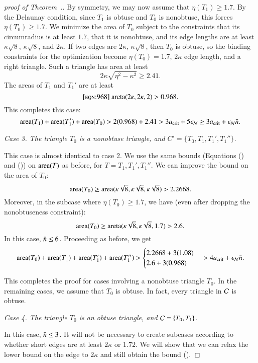 \begin{proof}[proof of Theorem~.]
By symmetry, we may now assume that $\eta(T_1) \ge 1.7$.  By the
Delaunay condition, since $T_1$ is obtuse and $T_0$ is nonobtuse, this
forces $\eta(T_0)\ge 1.7$.  We minimize the area of $T_0$ subject to
the constraints that its circumradius is at least $1.7$, that it is
nonobtuse, and its edge lengths are at least $\kappa\sqrt{8}$,
$\kappa\sqrt{8}$, and $2\kappa$.  If two edges are $2\kappa$,
$\kappa\sqrt{8}$, then $T_0$ is obtuse, so the binding constraints for
the optimization become $\eta(T_0)=1.7$, $2\kappa$ edge length, and a
right triangle.  Such a triangle has area at least
\[
2\kappa\sqrt{\eta^2 - \kappa^2} \ge 2.41.
\]  
The areas of $T_1$ and $T_1'$ are at least
\begin{equation}\libel{eqn:968}
\areta(2\kappa,2\kappa,2) > 0.968.
\end{equation}
This completes this case:
\[
{\operatorname{area}}(T_1) + {\operatorname{area}}(T_1') + {\operatorname{area}}(T_0) 
>
2(0.968) + 2.41 > 3a_\text{crit} + 5 \epsilon_{\mathcal N} \ge 3a_\text{crit} + \epsilon_{\mathcal N} \bar n.
\] %

{\it Case 3. The triangle $T_0$ is a nonobtuse triangle, and
  $C'=\{T_0,T_1,T_1',T_1''\}$.}

This case is almost identical to case 2.  We use the same bounds
(Equations () and ()) on ${\operatorname{area}}(T)$ as
before, for $T = T_1, T_1', T_1''$.  We can improve the bound on the
area of $T_0$:
\[
{\operatorname{area}}(T_0) \ge {\operatorname{area}}(\kappa\sqrt{8},\kappa\sqrt{8},\kappa\sqrt{8}) > 2.2668.
\]
Moreover, in the subcase where $\eta(T_0)\ge 1.7$, we have
(even after dropping the nonobtuseness constraint):
\[
{\operatorname{area}}(T_0) \ge {\operatorname{areta}}(\kappa\sqrt{8},\kappa\sqrt{8},1.7) > 2.6.
\]
In this case, $\bar n\le 6$.  Proceeding as before, we get
\[
{\operatorname{area}}(T_0)  + {\operatorname{area}}(T_1) + {\operatorname{area}}(T_1') + {\operatorname{area}}(T_1'') > 
\begin{cases}
2.2668 + 3 (1.08) \\
2.6 + 3(0.968)
\end{cases}
> 4a_\text{crit} +  \epsilon_{\mathcal N} \bar n.
\] %


This completes the proof for cases involving a nonobtuse triangle
$T_0$.  In the remaining cases, we assume that $T_0$ is obtuse.  In
fact, every triangle in $\mathcal C$ is obtuse.

{\it Case 4. The triangle $T_0$ is an obtuse triangle, and $\mathcal C=\{T_0,T_1\}$.}  

In this case, $\bar n\le 3$.  It will not be necessary to create subcases
according to whether short edges are at least $2\kappa$ or $1.72$.  We
will show that we can relax the lower bound on the edge to $2\kappa$
and still obtain the bound ().


\end{proof}
